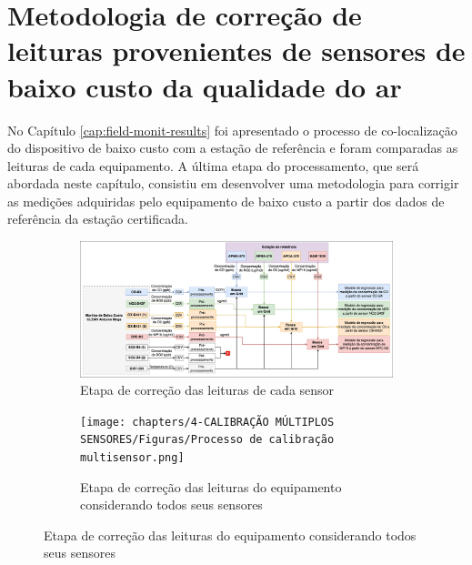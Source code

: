 
\chapter{Metodologia de correção de leituras provenientes de sensores de baixo custo da qualidade do ar}\label{cap:calib-methodology}

No Capítulo \ref{cap:field-monit-results} foi apresentado o processo de co-localização do dispositivo de baixo custo com a estação de referência e foram comparadas as leituras de cada equipamento. A última etapa do processamento, que será abordada neste capítulo, consistiu em desenvolver uma metodologia para corrigir as medições adquiridas pelo equipamento de baixo custo a partir dos dados de referência da estação certificada. 

\begin{figure}[h!]
    \centering
    \caption{Fluxogramas do processo de correção das leituras do equipamento de baixo custo}
    \begin{subfigure}{0.9\textwidth}
        \includegraphics[width=\textwidth]{chapters/4-CALIBRAÇÃO MÚLTIPLOS SENSORES/Figuras/Processo de calibração unisensor.png}
        \caption{Etapa de correção das leituras de cada sensor}
        \label{fig:calibration-unisensor}
    \end{subfigure}
    \begin{subfigure}{0.9\textwidth}
        \texttt{[image: chapters/4-CALIBRAÇÃO MÚLTIPLOS SENSORES/Figuras/Processo de calibração multisensor.png]}
        \caption{Etapa de correção das leituras do equipamento considerando todos seus sensores}
        \label{fig:calibration-multisensor}
    \end{subfigure}
\end{figure}

